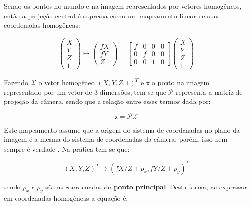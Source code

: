 {Sendo os pontos no mundo e na imagem representados por vetores homogêneos, então a projeção central é expressa como um mapeamento linear de suas coordenadas homogêneas:

\begin{align}
\left(\begin{array}{c}
X\\
Y\\
Z\\
1
\end{array}\right) \mapsto
\left(\begin{array}{c}
fX\\
fY\\
Z
\end{array}\right) =
\left[\begin{array}{cccc}
f & 0 & 0 & 0\\
0 & f & 0 & 0\\
0 & 0 & 1 & 0
\end{array}\right]
\left(\begin{array}{c}
X\\
Y\\
Z\\
1
\end{array}\right)
\label{eq:3d_vetHomogeneo1}
\end{align}

Fazendo $\mathcal{X}$ o vetor homogêneo $(X,Y,Z,1)^T$ e $\mathtt{x}$ o ponto na imagem representado por um vetor de 3 dimensões, tem se que $\bm{\mathcal{P}}$ representa a matriz de projeção da câmera, sendo que a relação entre esses termos dada por:

\begin{equation}
\mathtt{x} = \bm{\mathcal{P}}\mathcal{X}
\label{eq:3d_Pmatriz}
\end{equation}

Este mapeamento assume que a origem do sistema de coordenadas no plano da imagem é a mesma do sistema de coordenadas da câmera; porém, isso nem sempre é verdade \cite{hartley2003multiple}. Na prática tem-se que:

\begin{equation}
(X,Y,Z)^T \mapsto (fX/Z + p_x,fY/Z + p_y)^T
\label{eq:3d_mapForaCentro}
\end{equation}


sendo $p_x$ e $p_y$ são as coordenadas do \textbf{ponto principal}. Desta forma, ao expressar em coordenadas homogêneas a equação é:

}
